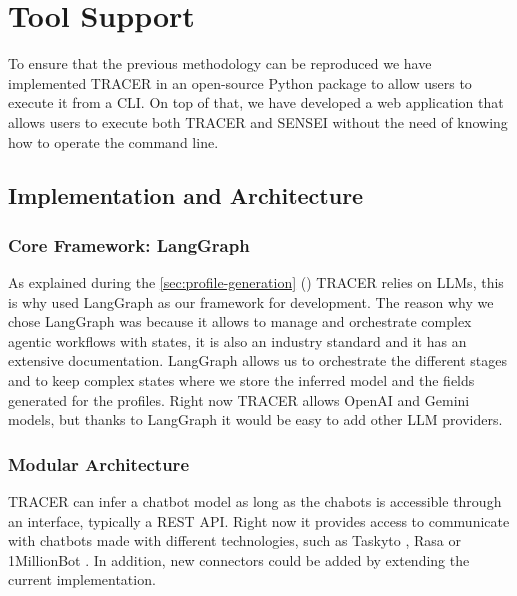
\chapter{Tool Support}\label{chapter:tool_support}

To ensure that the previous methodology can be reproduced
we have implemented \acf{TRACER} in an open-source Python package
to allow users to execute it from a \ac{CLI}.
On top of that, we have developed a web application
that allows users to execute both \ac{TRACER} and SENSEI
without the need of knowing how to operate the command line.


\section{Implementation and Architecture}

\subsection{Core Framework: LangGraph}

As explained during the \autoref{sec:profile-generation} ()
\ac{TRACER} relies on \acp{LLM},
this is why used LangGraph \autocite{LangGraph} as our framework for development.
The reason why we chose LangGraph
was because it allows to manage and orchestrate
complex agentic workflows with states,
it is also an industry standard and
it has an extensive documentation.
LangGraph allows us to orchestrate the different stages
and to keep complex states where we store
the inferred model and the fields generated for the profiles.
Right now \ac{TRACER} allows OpenAI and Gemini models,
but thanks to LangGraph it would be easy to add other \ac{LLM} providers.

\subsection{Modular Architecture}

\ac{TRACER} can infer a chatbot model as long as
the chabots is accessible through an interface, typically a \acs{REST} \acs{API}.
Right now it provides access to communicate with chatbots made with different technologies,
such as Taskyto \autocite{sanchezcuadradoAutomatingDevelopmentTaskoriented2024}, Rasa \autocite{Rasa2020} or 1MillionBot \autocite{1MillionBot}.
In addition, new connectors could be added by extending the current implementation.

